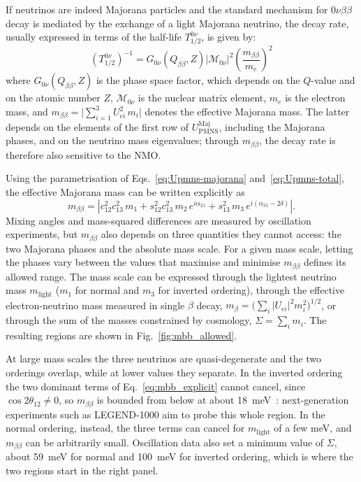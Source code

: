 If neutrinos are indeed Majorana particles and the standard mechanism for $0\nu\beta\beta$ decay is mediated by the exchange of a light Majorana neutrino, the decay rate, usually expressed in terms of the half-life $T_{1/2}^{0\nu}$, is given by:
\begin{equation}
    \label{eq:half-life_0nubb}
    (T_{1/2}^{0\nu})^{-1} = G_{0\nu}(Q_{\beta\beta}, Z) \left| \mathcal{M}_{0\nu} \right|^2 \left( \frac{m_{\beta\beta}}{m_e} \right)^2
\end{equation}
where $G_{0\nu}(Q_{\beta\beta}, Z)$ is the phase space factor, which depends on the $Q$-value and on the atomic number $Z$, $\mathcal{M}_{0\nu}$ is the nuclear matrix element, $m_e$ is the electron mass, and $m_{\beta\beta} = \big|\sum_{i=1}^{3} U_{ei}^2\, m_i\big|$ denotes the effective Majorana mass. The latter depends on the elements of the first row of $U_\text{PMNS}^\text{Maj}$, including the Majorana phases, and on the neutrino mass eigenvalues; through $m_{\beta\beta}$, the decay rate is therefore also sensitive to the \ac{NMO}.

Using the parametrisation of Eqs.~\ref{eq:Upmns-majorana} and~\ref{eq:Upmns-total}, the effective Majorana mass can be written explicitly as
\begin{equation}
  m_{\beta\beta} = \left| c_{12}^2 c_{13}^2\, m_1 + s_{12}^2 c_{13}^2\, m_2\, e^{i\alpha_{21}} + s_{13}^2\, m_3\, e^{i(\alpha_{31}-2\delta)} \right| .
  \label{eq:mbb_explicit}
\end{equation}
Mixing angles and mass-squared differences are measured by oscillation experiments, but $m_{\beta\beta}$ also depends on three quantities they cannot access: the two Majorana phases and the absolute mass scale. For a given mass scale, letting the phases vary between the values that maximise and minimise $m_{\beta\beta}$ defines its allowed range. The mass scale can be expressed through the lightest neutrino mass $m_\text{light}$ ($m_1$ for normal and $m_3$ for inverted ordering), through the effective electron-neutrino mass measured in single $\beta$ decay, $m_\beta = \big(\sum_i |U_{ei}|^2 m_i^2\big)^{1/2}$, or through the sum of the masses constrained by cosmology, $\Sigma = \sum_i m_i$. The resulting regions are shown in Fig.~\ref{fig:mbb_allowed}.

At large mass scales the three neutrinos are quasi-degenerate and the two orderings overlap, while at lower values they separate. In the inverted ordering the two dominant terms of Eq.~\ref{eq:mbb_explicit} cannot cancel, since $\cos 2\theta_{12} \neq 0$, so $m_{\beta\beta}$ is bounded from below at about 18~meV~\cite{plot-esperiments_and_exposures}: next-generation experiments such as LEGEND-1000 aim to probe this whole region. In the normal ordering, instead, the three terms can cancel for $m_\text{light}$ of a few meV, and $m_{\beta\beta}$ can be arbitrarily small. Oscillation data also set a minimum value of $\Sigma$, about 59~meV for normal and 100~meV for inverted ordering, which is where the two regions start in the right panel.

